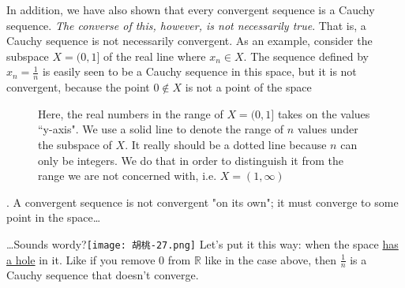 In addition, we have also shown that every convergent sequence is a Cauchy sequence. \textit{The converse of this,
however, is not necessarily true}. That is, a Cauchy sequence is not necessarily convergent. As an example, consider the
subspace $X = (0, 1]$ of the real line where $x_n \in X$. The sequence defined by $x_n = \frac{1}{n}$ is easily seen to
be a Cauchy sequence in this space, but it is not convergent, because the point $0 \not\in X$ is not a point of the
space

\begin{figure}[H]
    \centering
    \caption{Here, the real numbers in the range of $X = (0, 1]$ takes on the values ``y-axis". We use a solid line to
    denote the range of $n$ values under the subspace of $X$. It really should be a dotted line because $n$ can only be
    integers. We do that in order to distinguish it from the range we are not concerned with, i.e. $X = (1, \infty)$}
\end{figure}

. A convergent sequence is not convergent "on its own"; it must converge to
some point in the space\ldots

\ldots Sounds wordy?\texttt{[image: 胡桃-27.png]} Let's put it this way: when the space \href{https://www.reddit.com/r/learnmath/comments/exp735/comment/fgaqd8p/?utm\_source=share&utm\_medium=web3x&utm\_name=web3xcss&utm\_term=1&utm\_content=share\_button}{has a hole} in it. Like if you remove 0 from $\mathbb{R}$ like in the case above, then
$\frac{1}{n}$ is a Cauchy sequence that doesn't converge.

